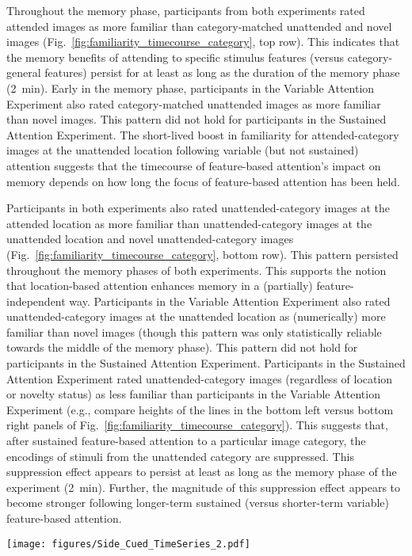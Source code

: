 \documentclass[english]{article}
\newcommand{\timecourseCuedLocation}{S5}
\newcommand{\timecourseUncuedLocation}{S6}
\begin{document}
Throughout the memory phase, participants from both experiments rated attended images as more familiar than category-matched unattended and novel images (Fig.~\ref{fig:familiarity_timecourse_category}, top row).  This indicates that the memory benefits of attending to specific stimulus features (versus category-general features) persist for at least as long as the duration of the memory phase (2~min).  Early in the memory phase, participants in the Variable Attention Experiment also rated category-matched unattended images as more familiar than novel images.  This pattern did not hold for participants in the Sustained Attention Experiment.  The short-lived boost in familiarity for attended-category images at the unattended location following variable (but not sustained) attention suggests that the timecourse of feature-based attention's impact on memory depends on how long the focus of feature-based attention has been held.

Participants in both experiments also rated unattended-category images at the attended location as more familiar than unattended-category images at the unattended location and novel unattended-category images (Fig.~\ref{fig:familiarity_timecourse_category}, bottom row).  This pattern persisted throughout the memory phases of both experiments.  This supports the notion that location-based attention enhances memory in a (partially) feature-independent way.  Participants in the Variable Attention Experiment also rated unattended-category images at the unattended location as (numerically) more familiar than novel images (though this pattern was only statistically reliable towards the middle of the memory phase).  This pattern did not hold for participants in the Sustained Attention Experiment.  Participants in the Sustained Attention Experiment rated unattended-category images (regardless of location or novelty status) as less familiar than participants in the Variable Attention Experiment (e.g., compare heights of the lines in the bottom left versus bottom right panels of Fig.~\ref{fig:familiarity_timecourse_category}).  This suggests that, after sustained feature-based attention to a particular image category, the encodings of stimuli from the unattended category are suppressed.  This suppression effect appears to persist at least as long as the memory phase of the experiment (2~min).  Further, the magnitude of this suppression effect appears to become stronger following longer-term sustained (versus shorter-term variable) feature-based attention.

\begin{figure*}[tp]
  \centering
  \texttt{[image: figures/Side\_Cued\_TimeSeries\_2.pdf]}
  \caption{\textbf{Familiarity ratings over time for images that matched the cued or uncued image location.}  This figure follows the same format and conventions as Figure~\ref{fig:familiarity_timecourse_category}.   Figures~\timecourseCuedLocation~and \timecourseUncuedLocation~display these results broken down by participant cohort.}
\label{fig:familiarity_timecourse_location}
\end{figure*}
\end{document}
